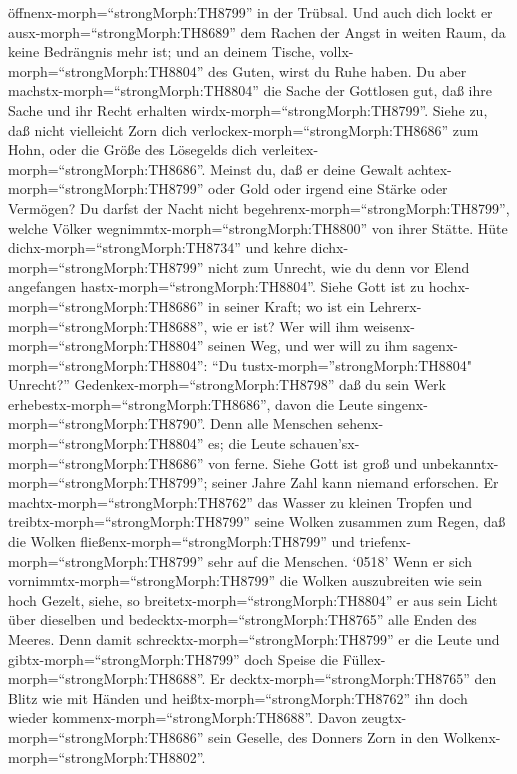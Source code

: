 öffnenx-morph=``strongMorph:TH8799'' in der Trübsal.  Und
auch dich lockt er ausx-morph=``strongMorph:TH8689'' dem Rachen der
Angst in weiten Raum, da keine Bedrängnis mehr ist; und an deinem
Tische, vollx-morph=``strongMorph:TH8804'' des Guten, wirst du Ruhe
haben.  Du aber machstx-morph=``strongMorph:TH8804'' die
Sache der Gottlosen gut, daß ihre Sache und ihr Recht erhalten
wirdx-morph=``strongMorph:TH8799''.  Siehe zu, daß nicht
vielleicht Zorn dich verlockex-morph=``strongMorph:TH8686'' zum Hohn,
oder die Größe des Lösegelds dich
verleitex-morph=``strongMorph:TH8686''.  Meinst du, daß er
deine Gewalt achtex-morph=``strongMorph:TH8799'' oder Gold oder irgend
eine Stärke oder Vermögen?  Du darfst der Nacht nicht
begehrenx-morph=``strongMorph:TH8799'', welche Völker
wegnimmtx-morph=``strongMorph:TH8800'' von ihrer Stätte. 
Hüte dichx-morph=``strongMorph:TH8734'' und kehre
dichx-morph=``strongMorph:TH8799'' nicht zum Unrecht, wie du denn vor
Elend angefangen hastx-morph=``strongMorph:TH8804''.  Siehe
Gott ist zu hochx-morph=``strongMorph:TH8686'' in seiner Kraft; wo ist
ein Lehrerx-morph=``strongMorph:TH8688'', wie er ist?  Wer
will ihm weisenx-morph=``strongMorph:TH8804'' seinen Weg, und wer will
zu ihm sagenx-morph=``strongMorph:TH8804'': ``Du
tustx-morph=''strongMorph:TH8804" Unrecht?'' 
Gedenkex-morph=``strongMorph:TH8798'' daß du sein Werk
erhebestx-morph=``strongMorph:TH8686'', davon die Leute
singenx-morph=``strongMorph:TH8790''.  Denn alle Menschen
sehenx-morph=``strongMorph:TH8804'' es; die Leute
schauen'sx-morph=``strongMorph:TH8686'' von ferne.  Siehe
Gott ist groß und unbekanntx-morph=``strongMorph:TH8799''; seiner Jahre
Zahl kann niemand erforschen.  Er
machtx-morph=``strongMorph:TH8762'' das Wasser zu kleinen Tropfen und
treibtx-morph=``strongMorph:TH8799'' seine Wolken zusammen zum Regen,
 daß die Wolken fließenx-morph=``strongMorph:TH8799'' und
triefenx-morph=``strongMorph:TH8799'' sehr auf die Menschen.
 `0518' Wenn er sich vornimmtx-morph=``strongMorph:TH8799''
die Wolken auszubreiten wie sein hoch Gezelt,  siehe, so
breitetx-morph=``strongMorph:TH8804'' er aus sein Licht über dieselben
und bedecktx-morph=``strongMorph:TH8765'' alle Enden des Meeres.
 Denn damit schrecktx-morph=``strongMorph:TH8799'' er die
Leute und gibtx-morph=``strongMorph:TH8799'' doch Speise die
Füllex-morph=``strongMorph:TH8688''.  Er
decktx-morph=``strongMorph:TH8765'' den Blitz wie mit Händen und
heißtx-morph=``strongMorph:TH8762'' ihn doch wieder
kommenx-morph=``strongMorph:TH8688''.  Davon
zeugtx-morph=``strongMorph:TH8686'' sein Geselle, des Donners Zorn in
den Wolkenx-morph=``strongMorph:TH8802''.

